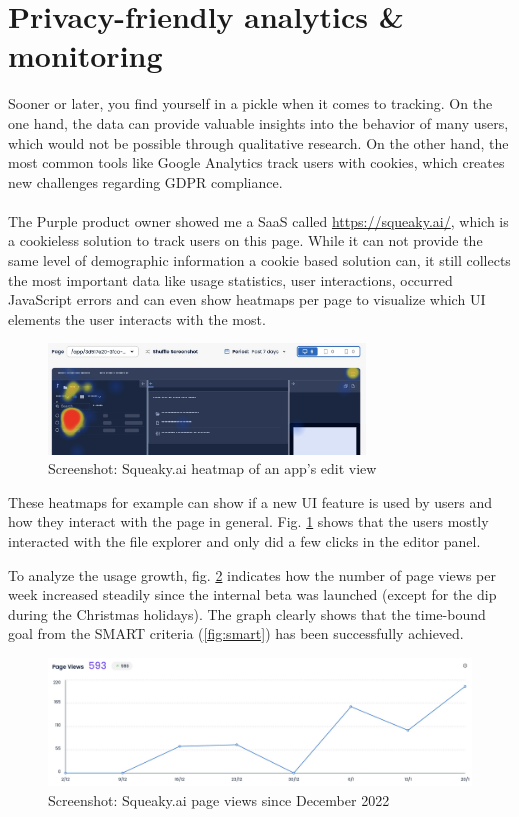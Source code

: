 \section{Privacy-friendly analytics \& monitoring}
\label{sec:analytics}

Sooner or later, you find yourself in a pickle when it comes to tracking.
On the one hand, the data can provide valuable insights into the behavior of many users, which would not be possible through qualitative research.
On the other hand, the most common tools like Google Analytics track users with cookies, which creates new challenges regarding GDPR compliance.
\\\\
The Purple product owner showed me a SaaS called \url{https://squeaky.ai/}, which is a cookieless solution to track users on this page.
While it can not provide the same level of demographic information a cookie based solution can, it still collects the most important data like usage statistics,
user interactions, occurred JavaScript errors and can even show heatmaps per page to visualize which UI elements the user interacts with the most.

\begin{figure}[h]
  \centering
  \includegraphics[width=0.75\textwidth]{pics/squeaky_heatmap.jpg}
  \caption{Screenshot: Squeaky.ai heatmap of an app's edit view}
  \label{fig:squeaky}
\end{figure}

These heatmaps for example can show if a new UI feature is used by users and how they interact with the page in general.
Fig. \ref{fig:squeaky} shows that the users mostly interacted with the file explorer and only did a few clicks in the editor panel.

To analyze the usage growth, fig. \ref{fig:squeaky_users} indicates how the number of page views per week increased steadily since the internal beta was launched (except for the dip during the Christmas holidays).
The graph clearly shows that the time-bound goal from the SMART criteria (\ref{fig:smart}) has been successfully achieved.

\begin{figure}[h]
  \centering
  \includegraphics[width=\textwidth]{pics/squeaky_user_curve.jpg}
  \caption{Screenshot: Squeaky.ai page views since December 2022}
  \label{fig:squeaky_users}
\end{figure}

